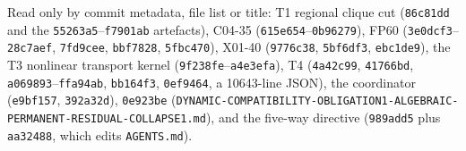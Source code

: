 \documentclass[11pt]{article}
\theoremstyle{remark}
\begin{document}
Read only by commit metadata, file list or title: T1 regional clique cut (\texttt{86c81dd}
and the \texttt{55263a5}--\texttt{f7901ab} artefacts), C04-35
(\texttt{615e654}--\texttt{0b96279}), FP60 (\texttt{3e0dcf3}--\texttt{28c7aef},
\texttt{7fd9cee}, \texttt{bbf7828}, \texttt{5fbc470}), X01-40 (\texttt{9776c38},
\texttt{5bf6df3}, \texttt{ebc1de9}), the T3 nonlinear transport kernel
(\texttt{9f238fe}--\texttt{a4e3efa}), T4 (\texttt{4a42c99}, \texttt{41766bd},
\texttt{a069893}--\texttt{ffa94ab}, \texttt{bb164f3}, \texttt{0ef9464}, a 10643-line JSON), the
coordinator (\texttt{e9bf157}, \texttt{392a32d}), \texttt{0e923be}
(\texttt{DYNAMIC-COMPATIBILITY-OBLIGATION1-\allowbreak ALGEBRAIC-PERMANENT-RESIDUAL-COLLAPSE1.md}),
and the five-way directive (\texttt{989add5} plus \texttt{aa32488}, which edits
\texttt{AGENTS.md}).
\end{document}
